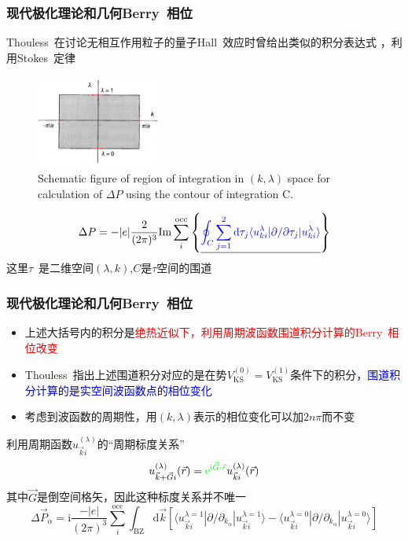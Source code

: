 \documentclass[cjk,slidestop,compress,mathserif,blue]{beamer}
\newcommand{\upcite}[1]{\hspace{0ex}\textsuperscript{\cite{#1}}} %
\begin{document}
\frame
{
	\frametitle{现代极化理论和几何\textrm{Berry~}相位}
	\textrm{Thouless~}在讨论无相互作用粒子的量子\textrm{Hall~}效应时曾给出类似的积分表达式%
	，利用\textrm{Stokes~}定律
\begin{figure}[h!]
\centering
\vspace*{-0.12in}
\includegraphics[height=1.2in,width=1.6in,viewport=0 0 800 540,clip]{Figures/Berry_contour_integration.png}
\caption{\tiny \textrm{Schematic figure of region of integration in $(k,\lambda)$ space for calculation of $\Delta P$ using the contour of integration C.}}%
\label{Berry_contour_integration}
\end{figure} 
	\begin{displaymath}
		\Delta P=-|e|\frac2{(2\pi)^3}\mathrm{Im}\sum_i^{\mathrm{occ}}\left\{ \underline{\textcolor{blue}{\oint_C\sum_{j=1}^2\mathrm{d}\tau_j\langle u_{k i}^{\lambda}|\partial/\partial\tau_j|u_{k i}^{\lambda}\rangle}} \right\} 
	\end{displaymath}
这里$\tau$~是二维空间$(\lambda,k)$,$C$是$\tau$空间的围道
}

\frame
{
	\frametitle{现代极化理论和几何\textrm{Berry~}相位}
	\begin{itemize}
		\item 上述大括号内的积分是\textcolor{red}{绝热近似下，利用周期波函数围道积分计算的\textrm{Berry~}相位改变}%
		\item \textrm{Thouless~}指出上述围道积分对应的是在势$V_{\mathrm{KS}}^{(0)}=V_{\mathrm{KS}}^{(1)}$条件下的积分，\textcolor{blue}{围道积分计算的是实空间波函数点的相位变化}
		\item 考虑到波函数的周期性，用$(k,\lambda)$表示的相位变化可以加$2n\pi$而不变
	\end{itemize}
	利用周期函数$u_{\vec k i}^{(\lambda)}$的“周期标度关系”
	\begin{displaymath}
		u_{\vec k+\vec G i}^{(\lambda)}(\vec r)=\textcolor{green}{\mathrm{e}^{\mathrm{i}\vec G\cdot\vec r}}u_{\vec k i}^{(\lambda)}(\vec r)
	\end{displaymath}
	其中$\vec G$是倒空间格矢，因此这种标度关系并不唯一
	\begin{displaymath}
		\Delta\vec P_{\alpha}=\mathrm{i}\frac{-|e|}{(2\pi)^3}\sum_i^{\mathrm{occ}}\int_{\mathrm{BZ}}\mathrm{d}\vec k\left[ \langle u_{\vec k i}^{\lambda=1}|\partial/\partial_{k_{\alpha}}|u_{\vec k i}^{\lambda=1}\rangle-\langle u_{\vec k i}^{\lambda=0}|\partial/\partial_{k_{\alpha}}|u_{\vec k i}^{\lambda=0}\rangle \right]
	\end{displaymath}
}
\end{document}
